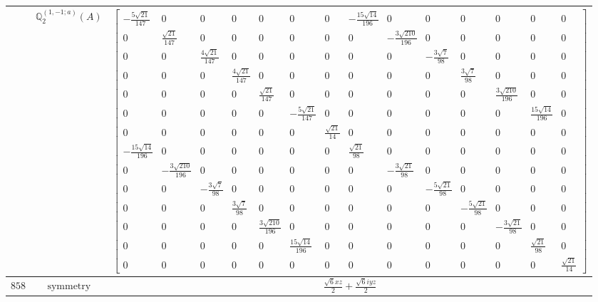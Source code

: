 \documentclass[fleqn,8pt,landscape]{jsarticle}
\begin{document}
\begin{longtable}{ccc}
$  $ & $ \mathbb{Q}_{2}^{(1,-1;a)}(A) $ & $ \begin{bmatrix} - \frac{5 \sqrt{21}}{147} & 0 & 0 & 0 & 0 & 0 & 0 & - \frac{15 \sqrt{14}}{196} & 0 & 0 & 0 & 0 & 0 & 0 \\ 0 & \frac{\sqrt{21}}{147} & 0 & 0 & 0 & 0 & 0 & 0 & - \frac{3 \sqrt{210}}{196} & 0 & 0 & 0 & 0 & 0 \\ 0 & 0 & \frac{4 \sqrt{21}}{147} & 0 & 0 & 0 & 0 & 0 & 0 & - \frac{3 \sqrt{7}}{98} & 0 & 0 & 0 & 0 \\ 0 & 0 & 0 & \frac{4 \sqrt{21}}{147} & 0 & 0 & 0 & 0 & 0 & 0 & \frac{3 \sqrt{7}}{98} & 0 & 0 & 0 \\ 0 & 0 & 0 & 0 & \frac{\sqrt{21}}{147} & 0 & 0 & 0 & 0 & 0 & 0 & \frac{3 \sqrt{210}}{196} & 0 & 0 \\ 0 & 0 & 0 & 0 & 0 & - \frac{5 \sqrt{21}}{147} & 0 & 0 & 0 & 0 & 0 & 0 & \frac{15 \sqrt{14}}{196} & 0 \\ 0 & 0 & 0 & 0 & 0 & 0 & \frac{\sqrt{21}}{14} & 0 & 0 & 0 & 0 & 0 & 0 & 0 \\ - \frac{15 \sqrt{14}}{196} & 0 & 0 & 0 & 0 & 0 & 0 & \frac{\sqrt{21}}{98} & 0 & 0 & 0 & 0 & 0 & 0 \\ 0 & - \frac{3 \sqrt{210}}{196} & 0 & 0 & 0 & 0 & 0 & 0 & - \frac{3 \sqrt{21}}{98} & 0 & 0 & 0 & 0 & 0 \\ 0 & 0 & - \frac{3 \sqrt{7}}{98} & 0 & 0 & 0 & 0 & 0 & 0 & - \frac{5 \sqrt{21}}{98} & 0 & 0 & 0 & 0 \\ 0 & 0 & 0 & \frac{3 \sqrt{7}}{98} & 0 & 0 & 0 & 0 & 0 & 0 & - \frac{5 \sqrt{21}}{98} & 0 & 0 & 0 \\ 0 & 0 & 0 & 0 & \frac{3 \sqrt{210}}{196} & 0 & 0 & 0 & 0 & 0 & 0 & - \frac{3 \sqrt{21}}{98} & 0 & 0 \\ 0 & 0 & 0 & 0 & 0 & \frac{15 \sqrt{14}}{196} & 0 & 0 & 0 & 0 & 0 & 0 & \frac{\sqrt{21}}{98} & 0 \\ 0 & 0 & 0 & 0 & 0 & 0 & 0 & 0 & 0 & 0 & 0 & 0 & 0 & \frac{\sqrt{21}}{14} \end{bmatrix} $ \\ \hline
$ 858 $ & $ \text{symmetry} $ & $ \frac{\sqrt{6} x z}{2} + \frac{\sqrt{6} i y z}{2} $ \\

\end{longtable}
\end{document}
